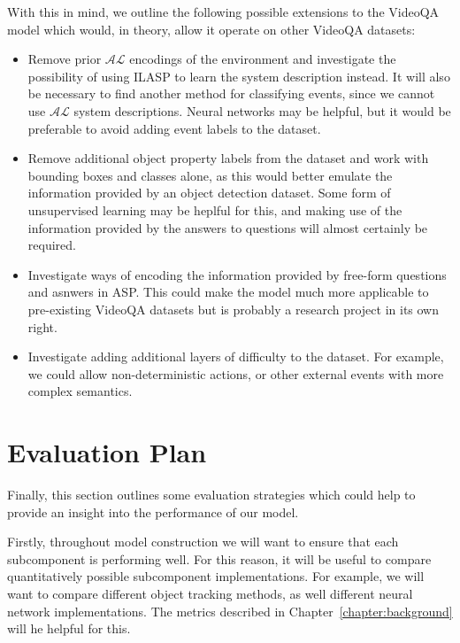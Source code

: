 \documentclass[../interim.tex]{subfiles}
\begin{document}
With this in mind, we outline the following possible extensions to the VideoQA model which would, in theory, allow it operate on other VideoQA datasets:
\begin{itemize}
  \item Remove prior $\mathcal{AL}$ encodings of the environment and investigate the possibility of using ILASP to learn the system description instead. It will also be necessary to find another method for classifying events, since we cannot use $\mathcal{AL}$ system descriptions. Neural networks may be helpful, but it would be preferable to avoid adding event labels to the dataset.

  \item Remove additional object property labels from the dataset and work with bounding boxes and classes alone, as this would better emulate the information provided by an object detection dataset. Some form of unsupervised learning may be heplful for this, and making use of the information provided by the answers to questions will almost certainly be required.

  \item Investigate ways of encoding the information provided by free-form questions and asnwers in ASP. This could make the model much more applicable to pre-existing VideoQA datasets but is probably a research project in its own right.

  \item Investigate adding additional layers of difficulty to the dataset. For example, we could allow non-deterministic actions, or other external events with more complex semantics.
\end{itemize}

\section{Evaluation Plan}

Finally, this section outlines some evaluation strategies which could help to provide an insight into the performance of our model.

Firstly, throughout model construction we will want to ensure that each subcomponent is performing well. For this reason, it will be useful to compare quantitatively possible subcomponent implementations. For example, we will want to compare different object tracking methods, as well different neural network implementations. The metrics described in Chapter~\ref{chapter:background} will he helpful for this.
\end{document}
